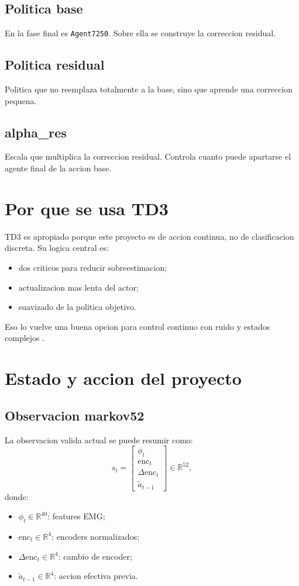 \documentclass[11pt,a4paper]{article}
\begin{document}
\subsection*{Politica base}
En la fase final es \texttt{Agent7250}. Sobre ella se construye la correccion residual.

\subsection*{Politica residual}
Politica que no reemplaza totalmente a la base, sino que aprende una correccion pequena.

\subsection*{alpha\_res}
Escala que multiplica la correccion residual. Controla cuanto puede apartarse el agente final de la accion base.

\section{Por que se usa TD3}

TD3 es apropiado porque este proyecto es de accion continua, no de clasificacion discreta. Su logica central es:
\begin{itemize}[leftmargin=1.5em]
\item dos criticos para reducir sobreestimacion;
\item actualizacion mas lenta del actor;
\item suavizado de la politica objetivo.
\end{itemize}

Eso lo vuelve una buena opcion para control continuo con ruido y estados complejos \citep{fujimoto2018td3,mathworks_td3_agent,mathworks_td3_options}.

\section{Estado y accion del proyecto}

\subsection{Observacion markov52}

La observacion valida actual se puede resumir como:
\[
s_t=
\begin{bmatrix}
\phi_t \\
\mathrm{enc}_t \\
\Delta \mathrm{enc}_t \\
\tilde{a}_{t-1}
\end{bmatrix}
\in \mathbb{R}^{52},
\]
donde:
\begin{itemize}[leftmargin=1.5em]
\item \(\phi_t \in \mathbb{R}^{40}\): features EMG;
\item \(\mathrm{enc}_t \in \mathbb{R}^{4}\): encoders normalizados;
\item \(\Delta \mathrm{enc}_t \in \mathbb{R}^{4}\): cambio de encoder;
\item \(\tilde{a}_{t-1} \in \mathbb{R}^{4}\): accion efectiva previa.
\end{itemize}
\end{document}
